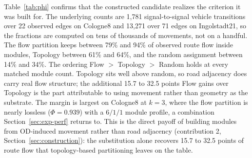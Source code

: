\documentclass[journal]{IEEEtran}
\theoremstyle{definition}
\begin{document}
Table~\ref{tab:phi} confirms that the constructed candidate realizes the criterion it was built for. The underlying counts are 1{,}781 signal-to-signal vehicle transitions over 22 observed edges on Cologne8 and 13{,}271 over 71 edges on Ingolstadt21, so the fractions are computed on tens of thousands of movements, not on a handful. The flow partition keeps between 79\% and 94\% of observed route flow inside modules, Topology between 61\% and 64\%, and the random assignment between 14\% and 34\%. The ordering Flow $>$ Topology $>$ Random holds at every matched module count. Topology sits well above random, so road adjacency does carry real flow structure; the additional 15.7 to 32.5 points Flow gains over Topology is the part attributable to using movement rather than geometry as the substrate. The margin is largest on Cologne8 at $k=3$, where the flow partition is nearly lossless ($\Phi=0.939$) with a $6/1/1$ module profile, a combination Section~\ref{sec:exp-perf} returns to. This is the direct payoff of building modules from OD-induced movement rather than road adjacency (contribution 2, Section~\ref{sec:construction}): the substitution alone recovers 15.7 to 32.5 points of route flow that topology-based partitioning leaves on the table.
\end{document}
